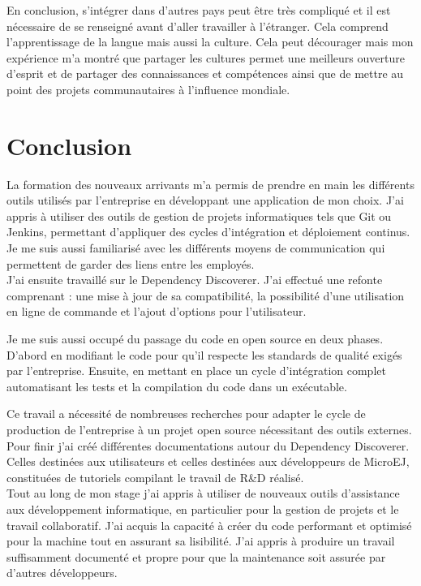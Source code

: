 \documentclass[french,a4paper,12pt]{report}
\begin{document}
En conclusion, s’intégrer dans d'autres pays peut être très compliqué et il est nécessaire de se renseigné avant d'aller travailler à l'étranger. Cela comprend l'apprentissage de la langue mais aussi la culture. Cela peut décourager mais mon expérience m'a montré que partager les cultures permet une meilleurs ouverture d'esprit et de partager des connaissances et compétences ainsi que de mettre au point des projets communautaires à l'influence mondiale.

\chapter{Conclusion}

La formation des nouveaux arrivants m'a permis de prendre en main les différents outils utilisés par l'entreprise en développant une application de mon choix. J'ai appris à utiliser des outils de gestion de projets informatiques tels que Git ou Jenkins, permettant d'appliquer des cycles d'intégration et déploiement continus.
Je me suis aussi familiarisé avec les différents moyens de communication qui permettent de garder des liens entre les employés.\\

J'ai ensuite travaillé sur le Dependency Discoverer. J'ai effectué une refonte comprenant : une mise à jour de sa compatibilité, la possibilité d'une utilisation en ligne de commande et l'ajout d'options pour l’utilisateur. 

Je me suis aussi occupé du passage du code en open source en deux phases. D'abord en modifiant le code pour qu'il respecte les standards de qualité exigés par l'entreprise. Ensuite, en mettant en place un cycle d'intégration complet automatisant les tests et la compilation du code dans un exécutable. 

Ce travail a nécessité de nombreuses recherches pour adapter le cycle de production de l'entreprise à un projet open source nécessitant des outils externes.\\

Pour finir j'ai créé différentes documentations autour du Dependency Discoverer. Celles destinées aux utilisateurs et celles destinées aux développeurs de MicroEJ, constituées de tutoriels compilant le travail de R\&D réalisé.\\

Tout au long de mon stage j’ai appris à utiliser de nouveaux outils d’assistance aux développement informatique, en particulier pour la gestion de projets et le travail collaboratif. J'ai acquis la capacité à créer du code performant et optimisé pour la machine tout en assurant sa lisibilité. J'ai appris à produire un travail suffisamment documenté et propre pour que la maintenance soit assurée par d'autres développeurs.\\
\end{document}
